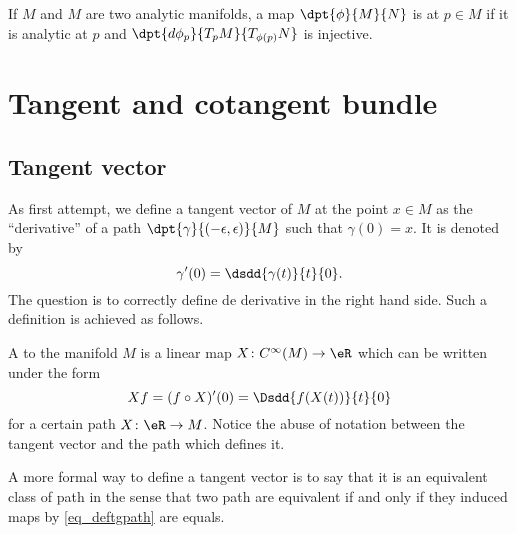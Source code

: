 \begin{definition}
    If $M$ and $M$ are two analytic manifolds, a map $\dpt{\phi}{M}{N}$ is \label{PgDefRegular} at $p\in M$ if it is analytic at $p$ and $\dpt{d\phi_p}{T_pM}{T_{\phi(p)}N}$ is injective.
\end{definition}


\section{Tangent and cotangent bundle}

\subsection{Tangent vector}

As first attempt, we define a tangent vector of $M$ at the point $x\in M$ as the ``derivative'' of a path $\dpt{\gamma}{(-\epsilon,\epsilon)}{M}$ such that $\gamma(0)=x$. It is denoted by
\[
\gamma'(0)= \dsdd{\gamma(t)}{t}{0}.
\]
The question is to correctly define de derivative in the right hand side. Such a definition is achieved as follows. 

\begin{definition}      \label{DEFooJJVIooDUBwDJ}
    A  to the manifold $M$ is a linear map $X\colon  C^{\infty}(M)\to \eR$ which can be written under the form
    \begin{equation}  \label{eq_deftgpath}
       Xf=(f\circ X)'(0)=\Dsdd{f(X(t))}{t}{0}
    \end{equation}
    for a certain path $X\colon \eR\to M$. Notice the abuse of notation between the tangent vector and the path which defines it.

    A more formal way to define a tangent vector is to say that it is an equivalent class of path in the sense that two path are equivalent if and only if they induced maps by \eqref{eq_deftgpath} are equals.
\end{definition}

